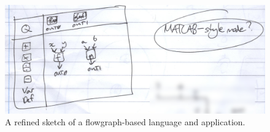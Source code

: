 \documentclass[12pt,twoside,notitlepage,xetex]{report}
\begin{document}
\begin{center}
\begin{figure}[H]
\begin{center}
\includegraphics[width=\textwidth]{figs/mockups/sketches/11/11jii.jpg}
\end{center}
\caption{A refined sketch of a flowgraph-based language and application.}
\label{fig:Flows2}
\end{figure}
\end{center}
\end{document}
